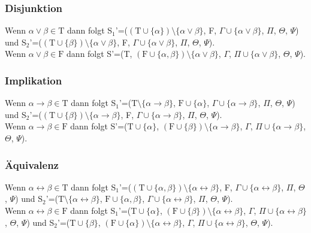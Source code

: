 \subsubsection{Disjunktion}
Wenn $\alpha\vee\beta\in\textrm{T}$ dann folgt S$_{1}$'=($(\textrm{T}\cup\lbrace\alpha\rbrace)\setminus\lbrace\alpha\vee\beta\rbrace$, F, $\Gamma\cup\lbrace\alpha\vee\beta\rbrace$, $\Pi$, $\Theta$, $\Psi$) und S$_{2}$'=($(\textrm{T}\cup\lbrace\beta\rbrace)\setminus\lbrace\alpha\vee\beta\rbrace$, F, $\Gamma\cup\lbrace\alpha\vee\beta\rbrace$, $\Pi$, $\Theta$, $\Psi$).\\
Wenn $\alpha\vee\beta\in\textrm{F}$ dann folgt S'=(T, $(\textrm{F}\cup\lbrace\alpha,\beta\rbrace)\setminus\lbrace\alpha\vee\beta\rbrace$, $\Gamma$, $\Pi\cup\lbrace\alpha\vee\beta\rbrace$, $\Theta$, $\Psi$).

\subsubsection{Implikation}
Wenn $\alpha\rightarrow\beta\in\textrm{T}$ dann folgt S$_{1}$'=($\textrm{T}\setminus\lbrace\alpha\rightarrow\beta\rbrace$, $\textrm{F}\cup\lbrace\alpha\rbrace$, $\Gamma\cup\lbrace\alpha\rightarrow\beta\rbrace$, $\Pi$, $\Theta$, $\Psi$) und S$_{2}$'=($(\textrm{T}\cup\lbrace\beta\rbrace)\setminus\lbrace\alpha\rightarrow\beta\rbrace$, F, $\Gamma\cup\lbrace\alpha\rightarrow\beta\rbrace$, $\Pi$, $\Theta$, $\Psi$).\\
Wenn $\alpha\rightarrow\beta\in\textrm{F}$ dann folgt S'=($\textrm{T}\cup\lbrace\alpha\rbrace$, $(\textrm{F}\cup\lbrace\beta\rbrace)\setminus\lbrace\alpha\rightarrow\beta\rbrace$, $\Gamma$, $\Pi\cup\lbrace\alpha\rightarrow\beta\rbrace$, $\Theta$, $\Psi$).

\subsubsection{Äquivalenz}
Wenn $\alpha\leftrightarrow\beta\in\textrm{T}$ dann folgt S$_{1}$'=($(\textrm{T}\cup\lbrace\alpha,\beta\rbrace)\setminus\lbrace\alpha\leftrightarrow\beta\rbrace$, F, $\Gamma\cup\lbrace\alpha\leftrightarrow\beta\rbrace$, $\Pi$, $\Theta$, $\Psi$) und S$_{2}$'=($\textrm{T}\setminus\lbrace\alpha\leftrightarrow\beta\rbrace$, $\textrm{F}\cup\lbrace\alpha,\beta\rbrace$, $\Gamma\cup\lbrace\alpha\leftrightarrow\beta\rbrace$, $\Pi$, $\Theta$, $\Psi$).\\
Wenn $\alpha\leftrightarrow\beta\in\textrm{F}$ dann folgt S$_{1}$'=($\textrm{T}\cup\lbrace\alpha\rbrace$, $(\textrm{F}\cup\lbrace\beta\rbrace)\setminus\lbrace\alpha\leftrightarrow\beta\rbrace$, $\Gamma$, $\Pi\cup\lbrace\alpha\leftrightarrow\beta\rbrace$, $\Theta$, $\Psi$) und S$_{2}$'=($\textrm{T}\cup\lbrace\beta\rbrace$, $(\textrm{F}\cup\lbrace\alpha\rbrace)\setminus\lbrace\alpha\leftrightarrow\beta\rbrace$, $\Gamma$, $\Pi\cup\lbrace\alpha\leftrightarrow\beta\rbrace$, $\Theta$, $\Psi$).

